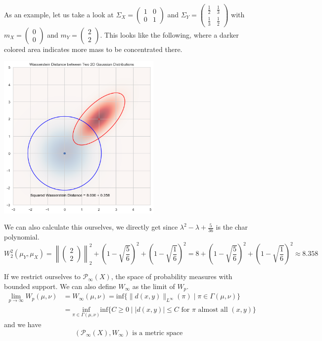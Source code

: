 \documentclass[15pt]{article}
\begin{document}
As an example, let us take a look at $\Sigma_X = \begin{pmatrix}1 & 0 \\ 0 & 1\end{pmatrix}$ and $\Sigma_Y = \begin{pmatrix}\frac{1}{2} & \frac{1}{3} \\ \frac{1}{3} & \frac{1}{2} \end{pmatrix}$ 
with $m_X = \begin{pmatrix}0 \\ 0 \end{pmatrix}$ and $m_Y = \begin{pmatrix}2 \\ 2 \end{pmatrix}$. This looks like the following, where a darker colored area indicates more mass to be concentrated there. 


\begin{center}
  \includegraphics*[width=0.6\textwidth]{Wasserstein.png}  
\end{center}

We can also calculate this ourselves, we directly get since $\lambda^2 - \lambda + \frac{5}{36}$ is the char polynomial. $$W_2^2(\mu_Y,\mu_X) = \left\|\begin{pmatrix}
  2 \\ 2
\end{pmatrix}\right\|_2^2 + \left(1-\sqrt{\frac{5}{6}}\right)^2 + \left(1-\sqrt{\frac{1}{6}}\right)^2 = 8 +\left(1-\sqrt{\frac{5}{6}}\right)^2 + \left(1-\sqrt{\frac{1}{6}}\right)^2 \approx 8.358$$
\bigbreak

If we restrict ourselves to $\mathcal{P}_\infty(X)$, the space of probability measures with bounded support. We can also define $W_\infty$ as the limit of $W_p$.
\begin{align*}\lim_{p \to \infty} W_p(\mu,\nu) &= W_\infty(\mu,\nu) =\text{inf}\{\|d(x,y)\|_{L^\infty}(\pi) \mid \pi \in \Gamma(\mu,\nu)\} \\
&= \underset{\pi \in \Gamma(\mu,\nu)}{\text{inf}}\text{inf}\{C \geq 0 \mid |d(x,y)| \leq C \text{ for } \pi \text{ almost all } (x,y)\} \end{align*} 
and we have $$(\mathcal{P}_\infty(X), W_\infty) \text{ is a metric space}$$
\end{document}
